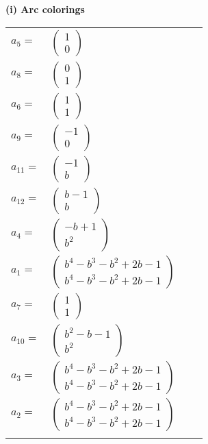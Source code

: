 \documentclass[1p]{elsarticle_modified}
\theoremstyle{definition}
\begin{document}
\flushleft \textbf{(i) Arc colorings}\\
\begin{tabular}{m{7pt} m{180pt} m{7pt} m{180pt} }
\flushright $a_{5}=$&$\begin{pmatrix}1\\0\end{pmatrix}$ \\
\flushright $a_{8}=$&$\begin{pmatrix}0\\1\end{pmatrix}$ \\
\flushright $a_{6}=$&$\begin{pmatrix}1\\1\end{pmatrix}$ \\
\flushright $a_{9}=$&$\begin{pmatrix}-1\\0\end{pmatrix}$ \\
\flushright $a_{11}=$&$\begin{pmatrix}-1\\b\end{pmatrix}$ \\
\flushright $a_{12}=$&$\begin{pmatrix}b-1\\b\end{pmatrix}$ \\
\flushright $a_{4}=$&$\begin{pmatrix}- b+1\\b^2\end{pmatrix}$ \\
\flushright $a_{1}=$&$\begin{pmatrix}b^4- b^3- b^2+2 b-1\\b^4- b^3- b^2+2 b-1\end{pmatrix}$ \\
\flushright $a_{7}=$&$\begin{pmatrix}1\\1\end{pmatrix}$ \\
\flushright $a_{10}=$&$\begin{pmatrix}b^2- b-1\\b^2\end{pmatrix}$ \\
\flushright $a_{3}=$&$\begin{pmatrix}b^4- b^3- b^2+2 b-1\\b^4- b^3- b^2+2 b-1\end{pmatrix}$ \\
\flushright $a_{2}=$&$\begin{pmatrix}b^4- b^3- b^2+2 b-1\\b^4- b^3- b^2+2 b-1\end{pmatrix}$\\&\end{tabular}
\end{document}
